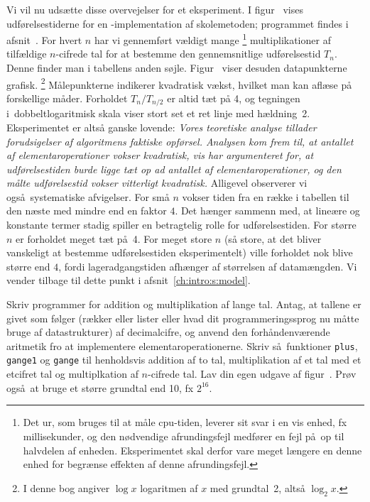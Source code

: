 Vi vil nu udsætte disse overvejelser for et eksperiment.
I figur~ vises udførelsestiderne for en \CC-implementation af skolemetoden;
programmet findes i afsnit~.
For hvert $n$ har vi gennemført vældigt mange
\footnote{Det ur, som bruges til at måle cpu-tiden, leverer sit svar i en vis enhed, fx millisekunder, og den nødvendige afrundingsfejl medfører en fejl på op til halvdelen af enheden. 
Eksperimentet skal derfor vare meget længere en denne enhed for begrænse effekten  af denne afrundingsfejl.}
multiplikationer af tilfældige $n$-cifrede tal for at bestemme den gennemsnitlige udførelsestid $T_n$.
Denne finder man i tabellens anden søjle.
Figur~ viser desuden datapunkterne grafisk.%
\footnote{I denne bog angiver $\log x$ logaritmen af $x$ med grundtal~2, altså $\log_2 x$.}%
Målepunkterne indikerer kvadratisk vækst, hvilket man kan aflæse på forskellige måder.
Forholdet $T_n/T_{n/2}$ er altid tæt på 4, og tegningen i dobbeltlogaritmisk skala viser stort set et ret linje med hældning~2.
Eksperimentet er altså ganske lovende:
\emph{Vores teoretiske analyse tillader forudsigelser af algoritmens faktiske opførsel.
Analysen kom frem til, at antallet af elementaroperationer vokser kvadratisk, vis har argumenteret for, at udførelsestiden burde ligge tæt op ad antallet af elementaroperationer, og den målte udførelsestid vokser vitterligt kvadratisk.} 
Alligevel observerer vi også systematiske afvigelser.
For små $n$ vokser tiden fra en række i tabellen til den næste med mindre end en faktor $4$.
Det hænger sammenn med, at lineære og konstante termer stadig spiller en betragtelig rolle for udførelsestiden.
For større $n$ er forholdet meget tæt på 4.
For meget store $n$ (så store, at det bliver vanskeligt at bestemme udførelsestiden eksperimentelt) ville forholdet nok blive større end $4$, fordi lageradgangstiden afhænger af størrelsen af datamængden.
Vi vender tilbage til dette punkt i afsnit~\ref{ch:intro:s:model}.

\begin{exerc} 
  Skriv programmer for addition og multiplikation af lange tal.
  Antag, at tallene er givet som følger (rækker eller lister eller hvad dit programmeringssprog nu måtte bruge af datastrukturer) af decimalcifre, og anvend den forhåndenværende aritmetik fro at implementere elementaroperationerne.
  Skriv så funktioner \texttt{plus}, \texttt{gange1} og \texttt{gange} til henholdsvis addition af to tal, multiplikation af et tal med et etcifret tal og multiplkation af $n$-cifrede tal.
  Lav din egen udgave af figur~.
  Prøv også at bruge et større grundtal end 10, fx $2^{16}$.  
\end{exerc}


